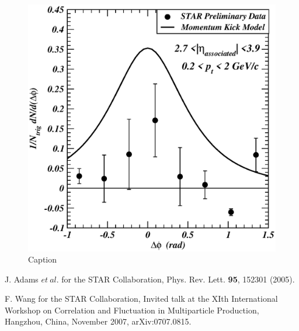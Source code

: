 \documentclass[showpacs,preprintnumbers,amsmath,amssymb,floatfix]{revtex4}
\begin{document}
\begin{figure} [h]
\includegraphics[angle=0,scale=0.50]{dndfiwfq2739}
\vspace*{0.0cm}
\caption{ Caption 
}
\end{figure}



\vspace*{-0.3cm}
\begin{thebibliography}{99}

J. Adams $et~al.$ for the STAR Collaboration, 
Phys. Rev. Lett. {\bf 95}, 152301 (2005). 


F. Wang for the STAR Collaboration, Invited talk at the XIth
International Workshop on Correlation and Fluctuation in Multiparticle
Production, Hangzhou, China, November 2007, arXiv:0707.0815.


\end{thebibliography} 
\end{document}
